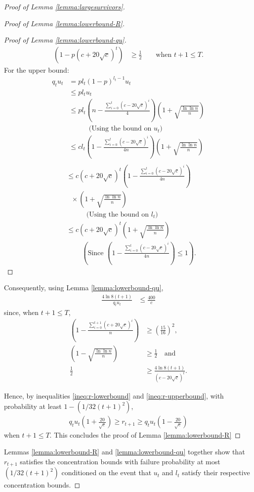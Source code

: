 \documentclass[11pt]{article}
\begin{document}
\begin{proof}[Proof of Lemma \ref{lemma:largesurvivors}]
\begin{proof}[Proof of Lemma \ref{lemma:lowerbound-R}]
\begin{proof}[Proof of Lemma \ref{lemma:lowerbound-qu}]
\begin{align*}
(1-p(c+20\sqrt{c})^t) &\geq \frac{1}{2} \quad \quad \text{when $t+1\leq T$.}
\end{align*}
For the upper bound:
\begin{align*}
q_tu_t &=pl_t(1-p)^{l_t-1}u_t\\
&\leq pl_tu_t\\
&\leq pl_t\left(n-\frac{\sum_{i=0}^t(c-20\sqrt{c})^i}{4}\right)\left(1+\sqrt{\frac{\ln{\ln{n}}}{n}}\right)\\
&\ \ \ \ \quad \quad \text{(Using the bound on $u_t$)}\\
&\leq cl_t\left(1-\frac{\sum_{i=0}^t(c-20\sqrt{c})^i}{4n}\right)\left(1+\sqrt{\frac{\ln{\ln{n}}}{n}}\right)\\
\end{align*}
\begin{align*}
&\leq c(c+20\sqrt{c})^t\left(1-\frac{\sum_{i=0}^t(c-20\sqrt{c})^i}{4n}\right)\\
&\ \ \ \times \left(1+\sqrt{\frac{\ln{\ln{n}}}{n}}\right)\\
&\ \ \ \ \quad \quad \text{(Using the bound on $l_t$)}\\
&\leq c(c+20\sqrt{c})^t\left(1+\sqrt{\frac{\ln{\ln{n}}}{n}}\right) \\
&\ \quad \quad \left(\text{Since $\left(1-\frac{\sum_{i=0}^t(c-20\sqrt{c})^i}{4n}\right)\leq 1$}\right).
\end{align*}
\end{proof}

Consequently, using Lemma \ref{lemma:lowerbound-qu}, \begin{align*}
\frac{4\ln{8(t+1)}}{q_tu_t} &\leq \frac{400}{c}
\end{align*}
since, when $t+1\leq T$,
\begin{align*}
\left(1-\frac{\sum_{i=0}^{t+1}(c+20\sqrt{c})^i}{n}\right) &\geq \left(\frac{15}{16}\right)^2,\\
\left(1-\sqrt{\frac{\ln{\ln{n}}}{n}}\right) &\geq \frac{1}{2} \quad \text{and}\\
\frac{1}{2} &\geq \frac{4\ln{8(t+1)}}{(c-20\sqrt{c})^{t}}.
\end{align*}

Hence, by inequalities \ref{ineq:r-lowerbound} and \ref{ineq:r-upperbound}, with probability at least $1-(1/32(t+1)^2)$, \begin{align}
q_tu_t\left(1+\frac{20}{\sqrt{c}}\right) \geq r_{t+1} \geq q_tu_t\left(1-\frac{20}{\sqrt{c}}\right)
\end{align}
when $t+1\leq T$. This concludes the proof of Lemma \ref{lemma:lowerbound-R}
\end{proof}
Lemmas \ref{lemma:lowerbound-R} and \ref{lemma:lowerbound-qu} together show that $r_{t+1}$ satisfies the concentration bounds with failure probability at most $(1/32(t+1)^2)$ conditioned on the event that $u_t$ and $l_t$ satisfy their respective concentration bounds.


\end{proof}
\end{document}

